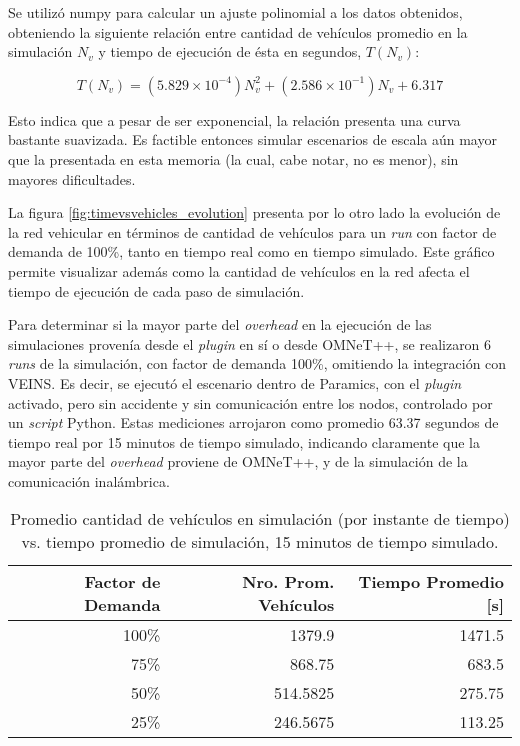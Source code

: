 Se utilizó numpy para calcular un ajuste polinomial a los datos obtenidos, obteniendo la siguiente relación entre cantidad de vehículos promedio en la simulación $N_{v}$ y tiempo de ejecución de ésta en segundos, $T(N_{v})$:

\[ T(N_{v}) = (5.829 \times 10^{-4})N_{v}^{2} + (2.586 \times 10^{-1})N_{v} + 6.317 \]

Esto indica que a pesar de ser exponencial, la relación presenta una curva bastante suavizada. Es factible entonces simular escenarios de escala aún mayor que la presentada en esta memoria (la cual, cabe notar, no es menor), sin mayores dificultades.

La figura \ref{fig:timevsvehicles_evolution} presenta por lo otro lado la evolución de la red vehicular en términos de cantidad de vehículos para un \emph{run} con factor de demanda de 100\%, tanto en tiempo real como en tiempo simulado. Este gráfico permite visualizar además como la cantidad de vehículos en la red afecta el tiempo de ejecución de cada paso de simulación.

Para determinar si la mayor parte del \emph{overhead} en la ejecución de las simulaciones provenía desde el \emph{plugin} en sí o desde OMNeT++, se realizaron 6 \emph{runs} de la simulación, con factor de demanda 100\%, omitiendo la integración con VEINS. Es decir, se ejecutó el escenario dentro de Paramics, con el \emph{plugin} activado, pero sin accidente y sin comunicación entre los nodos, controlado por un \emph{script} Python. Estas mediciones arrojaron como promedio 63.37 segundos de tiempo real por 15 minutos de tiempo simulado, indicando claramente que la mayor parte del \emph{overhead} proviene de OMNeT++, y de la simulación de la comunicación inalámbrica.

\begin{table}[tpb]
    \centering
    \begin{tabular}{@{}rrr@{}}
        \textbf{Factor de Demanda} & \textbf{Nro. Prom. Vehículos} & \textbf{Tiempo Promedio [s]} \\ \midrule
        100\%           & 1379.9          & 1471.5              \\ %
        75\%            & 868.75          & 683.5               \\ %
        50\%            & 514.5825        & 275.75              \\ %
        25\%            & 246.5675        & 113.25              \\ \bottomrule
    \end{tabular}
    \caption[Cantidad de vehículos vs. tiempo real de simulación]{Promedio cantidad de vehículos en simulación (por instante de tiempo) vs. tiempo promedio de simulación, 15 minutos de tiempo simulado.}
    \label{table:vehiclesvstime}
\end{table}

